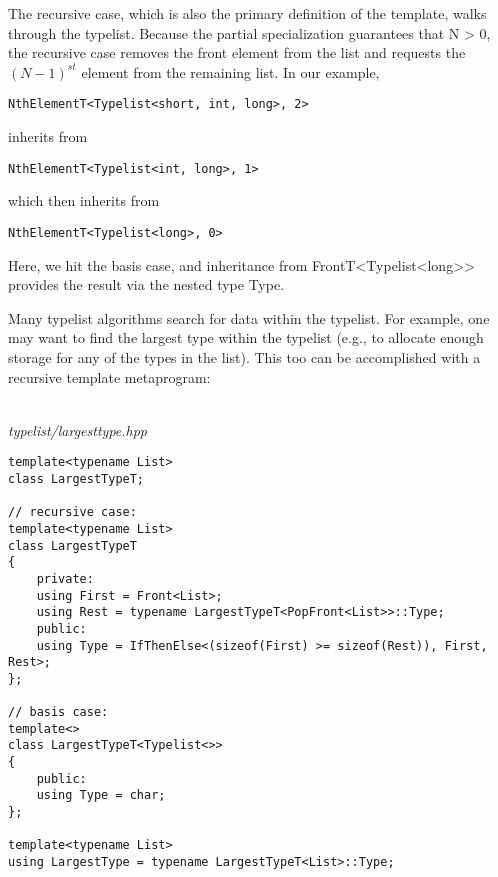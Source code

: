 The recursive case, which is also the primary definition of the template, walks through the typelist. Because the partial specialization guarantees that N > 0, the recursive case removes the front element from the list and requests the $ (N − 1)^{st} $ element from the remaining list. In our example,

\begin{lstlisting}[style=styleCXX]
NthElementT<Typelist<short, int, long>, 2>
\end{lstlisting}

inherits from

\begin{lstlisting}[style=styleCXX]
NthElementT<Typelist<int, long>, 1>
\end{lstlisting}

which then inherits from

\begin{lstlisting}[style=styleCXX]
NthElementT<Typelist<long>, 0>
\end{lstlisting}

Here, we hit the basis case, and inheritance from FrontT<Typelist<long>> provides the result via the nested type Type.


Many typelist algorithms search for data within the typelist. For example, one may want to find the largest type within the typelist (e.g., to allocate enough storage for any of the types in the list). This too can be accomplished with a recursive template metaprogram:

\hspace*{\fill} \\ %
\noindent
\textit{typelist/largesttype.hpp}
\begin{lstlisting}[style=styleCXX]
template<typename List>
class LargestTypeT;

// recursive case:
template<typename List>
class LargestTypeT
{
	private:
	using First = Front<List>;
	using Rest = typename LargestTypeT<PopFront<List>>::Type;
	public:
	using Type = IfThenElse<(sizeof(First) >= sizeof(Rest)), First, Rest>;
};

// basis case:
template<>
class LargestTypeT<Typelist<>>
{
	public:
	using Type = char;
};

template<typename List>
using LargestType = typename LargestTypeT<List>::Type;
\end{lstlisting}

